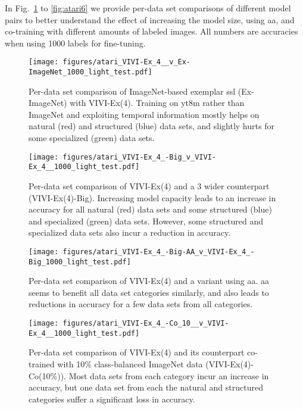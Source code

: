 \documentclass[10pt,twocolumn,letterpaper]{article}
\renewcommand{\paragraph}[1]{\noindent{\bf #1}\quad}
\begin{document}
{\paragraph{Additional figures} In Fig.~\ref{fig:atari2} to \ref{fig:atari6} we provide per-data set comparisons of different model pairs to better understand the effect of increasing the model size, using \gls{aa}, and co-training with different amounts of labeled images. All numbers are accuracies when using 1000 labels for fine-tuning.

\FloatBarrier

\begin{figure}[h]
\centering
\texttt{[image: figures/atari\_VIVI-Ex\_4\_\_v\_Ex-ImageNet\_1000\_light\_test.pdf]}
\caption{Per-data set comparison of ImageNet-based exemplar \gls{ssl} (Ex-ImageNet) with VIVI-Ex(4). Training on \gls{yt8m} rather than ImageNet and exploiting temporal information mostly helps on natural (red) and structured (blue) data sets, and slightly hurts for some specialized (green) data sets.}
\label{fig:atari2}
\end{figure}

\begin{figure}[h]
\centering
\texttt{[image: figures/atari\_VIVI-Ex\_4\_-Big\_v\_VIVI-Ex\_4\_\_1000\_light\_test.pdf]}
\caption{Per-data set comparison of VIVI-Ex(4) and a 3 wider counterpart (VIVI-Ex(4)-Big). Increasing model capacity leads to an increase in accuracy for all natural (red) data sets and some structured (blue) and specialized (green) data sets. However, some structured and specialized data sets also incur a reduction in accuracy.}
\label{fig:atari3}
\end{figure}


\begin{figure}[h]
\centering
\texttt{[image: figures/atari\_VIVI-Ex\_4\_-Big-AA\_v\_VIVI-Ex\_4\_-Big\_1000\_light\_test.pdf]}
\caption{Per-data set comparison of VIVI-Ex(4) and a variant using \gls{aa}. \gls{aa} seems to benefit all data set categories similarly, and also leads to reductions in accuracy for a few data sets from all categories.}
\label{fig:atari4}
\end{figure}

\begin{figure}[h]
\centering
\texttt{[image: figures/atari\_VIVI-Ex\_4\_-Co\_10\_\_v\_VIVI-Ex\_4\_\_1000\_light\_test.pdf]}
\caption{Per-data set comparison of VIVI-Ex(4) and its counterpart co-trained with 10\% class-balanced ImageNet data (VIVI-Ex(4)-Co(10\%)). Most data sets from each category incur an increase in accuracy, but one data set from each the natural and structured categories suffer a significant loss in accuracy.}
\label{fig:atari5}
\end{figure}

}
\end{document}
